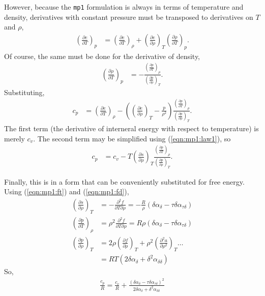 However, because the \texttt{mp1} formulation is always in terms of temperature and density, derivatives with constant pressure must be transposed to derivatives on $T$ and $\rho$, 
\begin{align*}
\left(\frac{\partial e}{\partial T}\right)_p &=  \left(\frac{\partial e}{\partial T}\right)_\rho +  \left(\frac{\partial e}{\partial \rho}\right)_T  \left(\frac{\partial \rho}{\partial T}\right)_p.
\end{align*}
Of course, the same must be done for the derivative of density,
\begin{align*}
\left(\frac{\partial \rho}{\partial T}\right)_p &= -\frac{ \left(\frac{\partial p}{\partial T}\right)_\rho }{ \left(\frac{\partial p}{\partial \rho}\right)_T }.
\end{align*}
Substituting,
\begin{align*}
c_p &= \left(\frac{\partial e}{\partial T}\right)_\rho - \left(\left(\frac{\partial e}{\partial \rho}\right)_T - \frac{p}{\rho^2}\right) \frac{ \left(\frac{\partial p}{\partial T}\right)_\rho }{ \left(\frac{\partial p}{\partial \rho}\right)_T }.
\end{align*}
The first term (the derivative of interneral energy with respect to temperature) is merely $c_v$.  The second term may be simplified using (\ref{eqn:mp1:law1}), so
\begin{align*}
c_p &= c_v - T\left(\frac{\partial s}{\partial \rho}\right)_T \frac{ \left(\frac{\partial p}{\partial T}\right)_\rho }{ \left(\frac{\partial p}{\partial \rho}\right)_T }.
\end{align*}

Finally, this is in a form that can be conveniently substituted for free energy.  Using (\ref{eqn:mp1:ft}) and (\ref{eqn:mp1:fd}),
\begin{align*}
\left(\frac{\partial s}{\partial \rho}\right)_T &= - \frac{\partial^2 f}{\partial T \partial \rho} = - \frac{R}{\rho}\left( \delta \alpha_\delta - \tau \delta \alpha_{\tau\delta} \right)\\
\left(\frac{\partial p}{\partial T}\right)_\rho &= \rho^2 \frac{\partial^2 f}{\partial T \partial \rho} = R \rho \left( \delta \alpha_\delta - \tau \delta \alpha_{\tau\delta} \right)\\
\left(\frac{\partial p}{\partial \rho}\right)_T &= 2 \rho \left(\frac{\partial f}{\partial \rho}\right)_T + \rho^2 \left(\frac{\partial^2 a}{\partial \rho^2}\right)_T \ldots\\
 &= RT \left( 2\delta \alpha_\delta + \delta^2 \alpha_{\delta\delta} \right)
\end{align*}
So, 
\begin{align}
\frac{c_p}{R} = \frac{c_v}{R} + \frac{\left(\delta \alpha_\delta - \tau \delta \alpha_{\tau\delta} \right)^2}{2\delta \alpha_\delta + \delta^2\alpha_{\delta\delta}}
\end{align}



